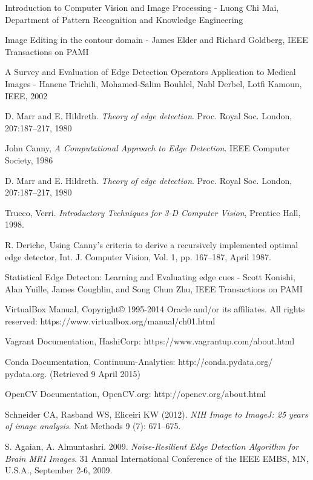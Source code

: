 \documentclass[a4paper,12pt]{article}
\begin{document}
\begin{thebibliography}{9}
Introduction to Computer Vision and Image Processing - Luong Chi Mai, Department of Pattern Recognition and Knowledge Engineering

Image Editing in the contour domain - James Elder and Richard Goldberg, IEEE Transactions on PAMI

A Survey and Evaluation of Edge Detection Operators Application to Medical Images - Hanene Trichili, Mohamed-Salim Bouhlel, Nabl Derbel, Lotfi Kamoun, IEEE, 2002

D. Marr and E. Hildreth. {\em Theory of edge detection}. Proc. Royal Soc. London, 207:187–217, 1980

John Canny, {\em A Computational Approach to Edge Detection}. IEEE Computer Society, 1986

D. Marr and E. Hildreth. {\em Theory of edge detection}. Proc. Royal Soc. London, 207:187–217, 1980

Trucco, Verri. {\em Introductory Techniques for 3-D Computer Vision}, Prentice Hall, 1998.

R. Deriche, Using Canny's criteria to derive a recursively implemented optimal edge detector, Int. J. Computer Vision, Vol. 1, pp. 167–187, April 1987.

Statistical Edge Detecton: Learning and Evaluating edge cues - Scott Konishi, Alan Yuille, James Coughlin, and Song Chun Zhu, IEEE Transactions on PAMI

VirtualBox Manual, Copyright© 1995-2014 Oracle and/or its affiliates. All rights reserved: https://www.virtualbox.org/manual/ch01.html

Vagrant Documentation, HashiCorp: https://www.vagrantup.com/about.html

Conda Documentation, Continuum-Analytics: http://conda.pydata.org/ pydata.org. (Retrieved 9 April 2015)

OpenCV Documentation, OpenCV.org: http://opencv.org/about.html

Schneider CA, Rasband WS, Eliceiri KW (2012). {\em NIH Image to ImageJ: 25 years of image analysis}. Nat Methods 9 (7): 671–675.

S. Agaian, A. Almuntashri. 2009. {\em Noise-Resilient Edge Detection Algorithm for Brain MRI Images}. 31 Annual International Conference of the IEEE EMBS, MN, U.S.A., September 2-6, 2009.


\end{thebibliography}
\end{document}
